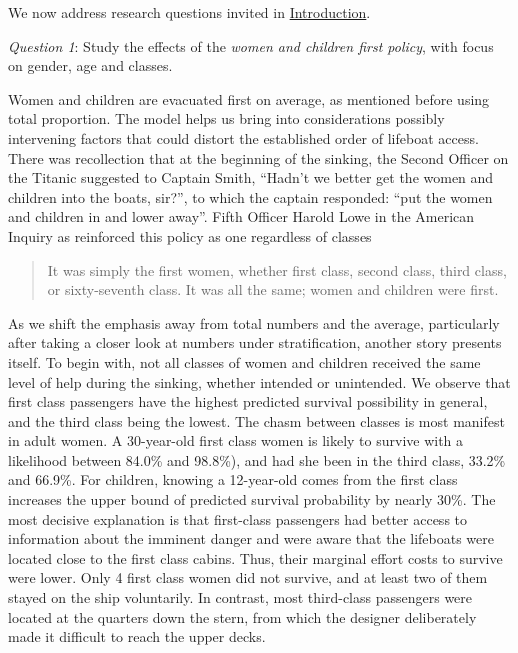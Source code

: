 \documentclass[]{interact}
\theoremstyle{plain}%
\theoremstyle{definition}
\theoremstyle{remark}
\begin{document}
We now address research questions invited in \protect\hyperlink{introduction}{Introduction}.

\hfill\break

\emph{Question 1}: Study the effects of the \emph{women and children first policy}, with focus on gender, age and classes.

Women and children are evacuated first on average, as mentioned before using total proportion. The model helps us bring into considerations possibly intervening factors that could distort the established order of lifeboat access. There was recollection that at the beginning of the sinking, the Second Officer on the Titanic suggested to Captain Smith, ``Hadn't we better get the women and children into the boats, sir?'', to which the captain responded: ``put the women and children in and lower away''. Fifth Officer Harold Lowe in the American Inquiry as reinforced this policy as one regardless of classes

\begin{quote}
It was simply the first women, whether first class, second class, third class, or sixty-seventh class. It was all the same; women and children were first.
\end{quote}

As we shift the emphasis away from total numbers and the average, particularly after taking a closer look at numbers under stratification, another story presents itself. To begin with, not all classes of women and children received the same level of help during the sinking, whether intended or unintended. We observe that first class passengers have the highest predicted survival possibility in general, and the third class being the lowest. The chasm between classes is most manifest in adult women. A 30-year-old first class women is likely to survive with a likelihood between 84.0\% and 98.8\%), and had she been in the third class, 33.2\% and 66.9\%. For children, knowing a 12-year-old comes from the first class increases the upper bound of predicted survival probability by nearly 30\%. The most decisive explanation is that first-class passengers had better access to information about the
imminent danger and were aware that the lifeboats were located close to the first class cabins. Thus, their marginal effort costs to survive were lower. Only 4 first class women did not survive, and at least two of them stayed on the ship voluntarily. In contrast, most third-class passengers were located at the quarters down the stern, from which the designer deliberately made it difficult to reach the upper decks.
\end{document}
